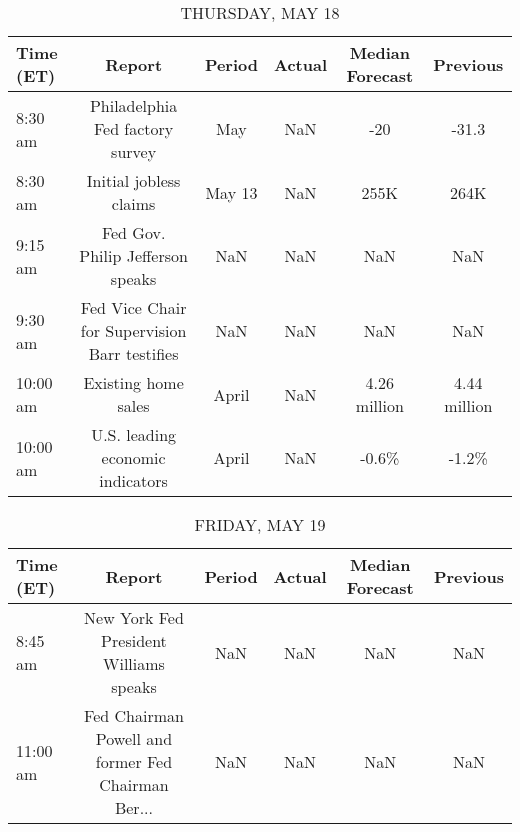 \documentclass{article}%
\begin{document}
%


\begin{table}[htbp]%
\caption{THURSDAY, MAY 18}%
\centering%
\begin{adjustbox}{width=1\textwidth}%
\begin{tabular}{lccccc}
\toprule
Time (ET) &                                        Report & Period & Actual & Median Forecast &     Previous \\
\midrule
  8:30 am &               Philadelphia Fed factory survey &    May &    NaN &             -20 &        -31.3 \\
  8:30 am &                        Initial jobless claims & May 13 &    NaN &            255K &         264K \\
  9:15 am &              Fed Gov. Philip Jefferson speaks &    NaN &    NaN &             NaN &          NaN \\
  9:30 am & Fed Vice Chair for Supervision Barr testifies &    NaN &    NaN &             NaN &          NaN \\
 10:00 am &                           Existing home sales &  April &    NaN &    4.26 million & 4.44 million \\
 10:00 am &              U.S. leading economic indicators &  April &    NaN &           -0.6\% &        -1.2\% \\
\bottomrule
\end{tabular}
%
\end{adjustbox}%
\end{table}

%


\begin{table}[htbp]%
\caption{FRIDAY, MAY 19}%
\centering%
\begin{adjustbox}{width=1\textwidth}%
\begin{tabular}{lccccc}
\toprule
Time (ET) &                                             Report & Period & Actual & Median Forecast & Previous \\
\midrule
  8:45 am &             New York Fed President Williams speaks &    NaN &    NaN &             NaN &      NaN \\
 11:00 am & Fed Chairman Powell and former Fed Chairman Ber... &    NaN &    NaN &             NaN &      NaN \\
\bottomrule
\end{tabular}
%
\end{adjustbox}%
\end{table}

%
\end{document}
